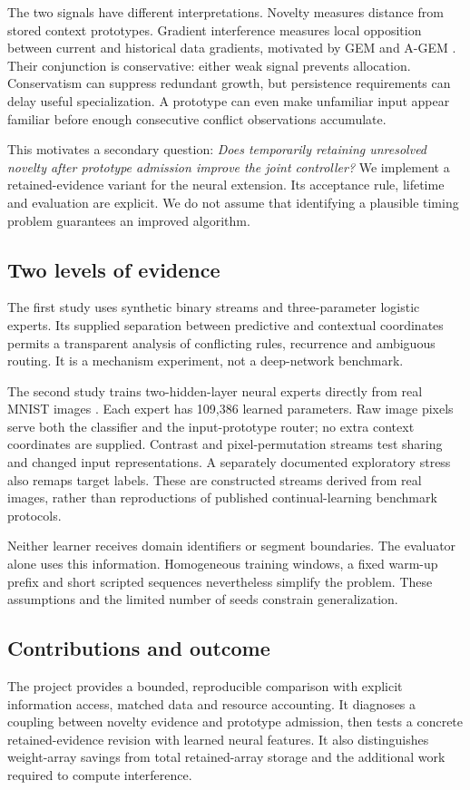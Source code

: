 The two signals have different interpretations. Novelty measures distance from stored context prototypes. Gradient interference measures local opposition between current and historical data gradients, motivated by GEM and A-GEM \cite{gem,agem}. Their conjunction is conservative: either weak signal prevents allocation. Conservatism can suppress redundant growth, but persistence requirements can delay useful specialization. A prototype can even make unfamiliar input appear familiar before enough consecutive conflict observations accumulate.

This motivates a secondary question: \emph{Does temporarily retaining unresolved novelty after prototype admission improve the joint controller?} We implement a retained-evidence variant for the neural extension. Its acceptance rule, lifetime and evaluation are explicit. We do not assume that identifying a plausible timing problem guarantees an improved algorithm.

\subsection{Two levels of evidence}
The first study uses synthetic binary streams and three-parameter logistic experts. Its supplied separation between predictive and contextual coordinates permits a transparent analysis of conflicting rules, recurrence and ambiguous routing. It is a mechanism experiment, not a deep-network benchmark.

The second study trains two-hidden-layer neural experts directly from real MNIST images \cite{mnist}. Each expert has 109,386 learned parameters. Raw image pixels serve both the classifier and the input-prototype router; no extra context coordinates are supplied. Contrast and pixel-permutation streams test sharing and changed input representations. A separately documented exploratory stress also remaps target labels. These are constructed streams derived from real images, rather than reproductions of published continual-learning benchmark protocols.

Neither learner receives domain identifiers or segment boundaries. The evaluator alone uses this information. Homogeneous training windows, a fixed warm-up prefix and short scripted sequences nevertheless simplify the problem. These assumptions and the limited number of seeds constrain generalization.

\subsection{Contributions and outcome}
The project provides a bounded, reproducible comparison with explicit information access, matched data and resource accounting. It diagnoses a coupling between novelty evidence and prototype admission, then tests a concrete retained-evidence revision with learned neural features. It also distinguishes weight-array savings from total retained-array storage and the additional work required to compute interference.


